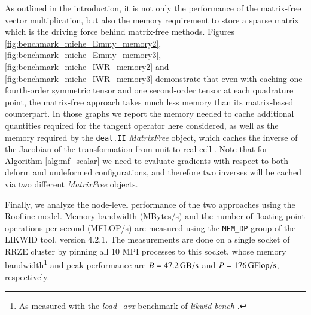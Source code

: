\documentclass[times,doublespace]{nmeauth}
\begin{document}
As outlined in the introduction, it is not only the performance of the matrix-free vector multiplication, but also the memory requirement to store a sparse matrix which is the driving force behind matrix-free methods.
Figures \ref{fig:benchmark_miehe_Emmy_memory2}, \ref{fig:benchmark_miehe_Emmy_memory3}, \ref{fig:benchmark_miehe_IWR_memory2} and \ref{fig:benchmark_miehe_IWR_memory3} demonstrate that even with caching one fourth-order symmetric tensor and one second-order tensor at each quadrature point, the matrix-free approach takes much less memory than its matrix-based counterpart.
{\color{red}
In those graphs we report the memory needed to cache additional quantities required for the tangent operator here considered,
as well as the memory required by the \texttt{deal.II} \textit{MatrixFree} object, which caches the inverse of the Jacobian of the transformation
from unit to real cell \cite{kronbichler12}.
Note that for Algorithm \ref{alg:mf_scalar} we need to evaluate gradients with respect to both deform and undeformed
configurations, and therefore two inverses will be cached via two different \textit{MatrixFree} objects.}

{\color{red}
Finally, we analyze the node-level performance of the two approaches using the Roofline model.
Memory bandwidth (MBytes/s) and the number of floating point operations per second (MFLOP/s) are measured using the \texttt{MEM\_DP} group of the LIKWID \cite{likwid} tool, version 4.2.1.
The measurements are done on a single socket of RRZE cluster by pinning all 10 MPI processes to this socket, whose
memory bandwidth\footnote{As measured with the \textit{load\_avx} benchmark of \textit{likwid-bench} \cite{likwid}.} and peak performance are $B=47.2 \,\rm{GB/s}$ and $P=176\, \rm{GFlop/s}$, respectively.
}
\end{document}
